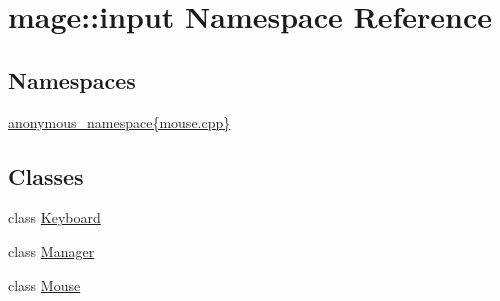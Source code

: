 \hypertarget{namespacemage_1_1input}{}\section{mage\+:\+:input Namespace Reference}
\label{namespacemage_1_1input}
\subsection*{Namespaces}
\begin{DoxyCompactItemize}
\item 
 \mbox{\hyperlink{namespacemage_1_1input_1_1anonymous__namespace_02mouse_8cpp_03}{anonymous\+\_\+namespace\{mouse.\+cpp\}}}
\end{DoxyCompactItemize}
\subsection*{Classes}
\begin{DoxyCompactItemize}
\item 
class \mbox{\hyperlink{classmage_1_1input_1_1_keyboard}{Keyboard}}
\item 
class \mbox{\hyperlink{classmage_1_1input_1_1_manager}{Manager}}
\item 
class \mbox{\hyperlink{classmage_1_1input_1_1_mouse}{Mouse}}
\end{DoxyCompactItemize}
